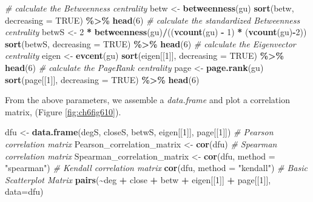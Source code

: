 \documentclass[
]{article}
\newenvironment{Shaded}{\begin{snugshade}}{\end{snugshade}}
\newcommand{\AttributeTok}[1]{\textcolor[rgb]{0.13,0.29,0.53}{#1}}
\newcommand{\CommentTok}[1]{\textcolor[rgb]{0.56,0.35,0.01}{\textit{#1}}}
\newcommand{\ConstantTok}[1]{\textcolor[rgb]{0.56,0.35,0.01}{#1}}
\newcommand{\DecValTok}[1]{\textcolor[rgb]{0.00,0.00,0.81}{#1}}
\newcommand{\FunctionTok}[1]{\textcolor[rgb]{0.13,0.29,0.53}{\textbf{#1}}}
\newcommand{\NormalTok}[1]{#1}
\newcommand{\OtherTok}[1]{\textcolor[rgb]{0.56,0.35,0.01}{#1}}
\newcommand{\SpecialCharTok}[1]{\textcolor[rgb]{0.81,0.36,0.00}{\textbf{#1}}}
\newcommand{\StringTok}[1]{\textcolor[rgb]{0.31,0.60,0.02}{#1}}
\begin{document}
\begin{Shaded}
\begin{Highlighting}[]
\CommentTok{\# calculate the Betweenness centrality}
\NormalTok{betw }\OtherTok{\textless{}{-}} \FunctionTok{betweenness}\NormalTok{(gu)}
\FunctionTok{sort}\NormalTok{(betw, }\AttributeTok{decreasing =} \ConstantTok{TRUE}\NormalTok{) }\SpecialCharTok{\%\textgreater{}\%} \FunctionTok{head}\NormalTok{(}\DecValTok{6}\NormalTok{)}
\CommentTok{\# calculate the standardized Betweenness centrality}
\NormalTok{betwS }\OtherTok{\textless{}{-}} \DecValTok{2} \SpecialCharTok{*} \FunctionTok{betweenness}\NormalTok{(gu)}\SpecialCharTok{/}\NormalTok{((}\FunctionTok{vcount}\NormalTok{(gu) }\SpecialCharTok{{-}} \DecValTok{1}\NormalTok{) }\SpecialCharTok{*}\NormalTok{ (}\FunctionTok{vcount}\NormalTok{(gu)}\SpecialCharTok{{-}}\DecValTok{2}\NormalTok{))}
\FunctionTok{sort}\NormalTok{(betwS, }\AttributeTok{decreasing =} \ConstantTok{TRUE}\NormalTok{) }\SpecialCharTok{\%\textgreater{}\%} \FunctionTok{head}\NormalTok{(}\DecValTok{6}\NormalTok{)}
\CommentTok{\# calculate the Eigenvector centrality}
\NormalTok{eigen }\OtherTok{\textless{}{-}} \FunctionTok{evcent}\NormalTok{(gu)}
\FunctionTok{sort}\NormalTok{(eigen[[}\DecValTok{1}\NormalTok{]], }\AttributeTok{decreasing =} \ConstantTok{TRUE}\NormalTok{) }\SpecialCharTok{\%\textgreater{}\%} \FunctionTok{head}\NormalTok{(}\DecValTok{6}\NormalTok{)}
\CommentTok{\# calculate the PageRank centrality}
\NormalTok{page }\OtherTok{\textless{}{-}} \FunctionTok{page.rank}\NormalTok{(gu)}
\FunctionTok{sort}\NormalTok{(page[[}\DecValTok{1}\NormalTok{]], }\AttributeTok{decreasing =} \ConstantTok{TRUE}\NormalTok{) }\SpecialCharTok{\%\textgreater{}\%} \FunctionTok{head}\NormalTok{(}\DecValTok{6}\NormalTok{)}
\end{Highlighting}
\end{Shaded}

\normalsize

From the above parameters, we assemble a \emph{data.frame} and plot a correlation matrix, (Figure \ref{fig:ch6fig610}).

\begin{Shaded}
\begin{Highlighting}[]
\NormalTok{dfu }\OtherTok{\textless{}{-}} \FunctionTok{data.frame}\NormalTok{(degS, closeS, betwS, eigen[[}\DecValTok{1}\NormalTok{]], page[[}\DecValTok{1}\NormalTok{]])}
\CommentTok{\# Pearson correlation matrix}
\NormalTok{Pearson\_correlation\_matrix }\OtherTok{\textless{}{-}} \FunctionTok{cor}\NormalTok{(dfu) }
\CommentTok{\# Spearman correlation matrix}
\NormalTok{Spearman\_correlation\_matrix }\OtherTok{\textless{}{-}} \FunctionTok{cor}\NormalTok{(dfu, }\AttributeTok{method =} \StringTok{"spearman"}\NormalTok{) }
\CommentTok{\# Kendall correlation matrix}
\FunctionTok{cor}\NormalTok{(dfu, }\AttributeTok{method =} \StringTok{"kendall"}\NormalTok{) }
\CommentTok{\# Basic Scatterplot Matrix}
\FunctionTok{pairs}\NormalTok{(}\SpecialCharTok{\textasciitilde{}}\NormalTok{deg }\SpecialCharTok{+}\NormalTok{ close }\SpecialCharTok{+}\NormalTok{ betw }\SpecialCharTok{+}\NormalTok{ eigen[[}\DecValTok{1}\NormalTok{]] }\SpecialCharTok{+}\NormalTok{ page[[}\DecValTok{1}\NormalTok{]],}
      \AttributeTok{data=}\NormalTok{dfu)}
\end{Highlighting}
\end{Shaded}
\end{document}
